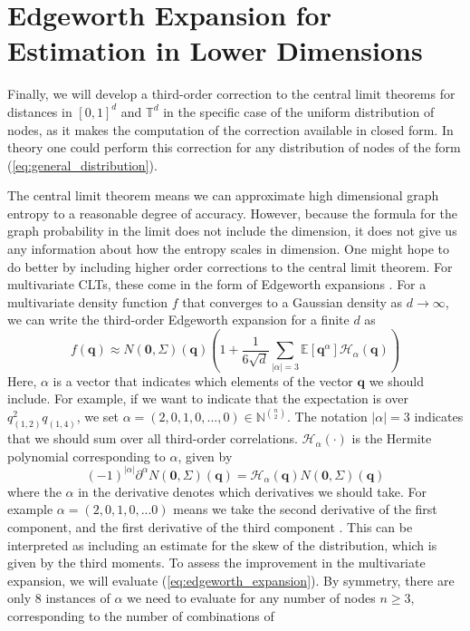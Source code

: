 \documentclass{article}
\newcommand{\tti}{\rightarrow\infty}
\begin{document}
\section{Edgeworth Expansion for Estimation in Lower Dimensions}
Finally, we will develop a third-order correction to the central limit theorems for distances in $[0,1]^d$ and $\mathbb{T}^d$ in the specific case of the uniform distribution of nodes, as it makes the computation of the correction available in closed form. In theory one could perform this correction for any distribution of nodes of the form (\ref{eq:general_distribution}). \newline

The central limit theorem means we can approximate high dimensional graph entropy to a reasonable degree of accuracy. However, because the formula for the graph probability in the limit does not include the dimension, it does not give us any information about how the entropy scales in dimension. One might hope to do better by including higher order corrections to the central limit theorem. For multivariate CLTs, these come in the form of Edgeworth expansions \cite{withers2000simple}. For a multivariate density function $f$ that converges to a Gaussian density as $d\tti$, we can write the third-order Edgeworth expansion for a finite $d$ as
\begin{equation}
    \label{eq:edgeworth_expansion}
    f(\boldsymbol{q}) \approx N(\boldsymbol{0}, \Sigma)(\boldsymbol{q})\left(1 + \frac{1}{6\sqrt{d}}\sum_{|\alpha| = 3} \mathbb{E}[\boldsymbol{q}^{\alpha}]\mathcal{H}_{\alpha}(\boldsymbol{q})\right)
\end{equation}
Here, $\alpha$ is a vector that indicates which elements of the vector $\boldsymbol{q}$ we should include. For example, if we want to indicate that the expectation is over $q_{(1,2)}^2q_{(1,4)}$, we set $\alpha = (2,0,1,0,...,0) \in \mathbb{N}^{\binom{n}{2}}$. The notation $|\alpha| = 3$ indicates that we should sum over all third-order correlations. $\mathcal{H}_{\alpha}(\cdot)$ is the Hermite polynomial corresponding to $\alpha$, given by
\begin{equation}
    (-1)^{|\alpha|} \partial^{\alpha} N(\boldsymbol{0}, \Sigma)(\boldsymbol{q}) = \mathcal{H}_{\alpha}(\boldsymbol{q})N(\boldsymbol{0}, \Sigma)(\boldsymbol{q})
\end{equation}
where the $\alpha$ in the derivative denotes which derivatives we should take. For example $\alpha = (2,0,1,0,...0)$ means we take the second derivative of the first component, and the first derivative of the third component \cite{skovgaard1986multivariate}. This can be interpreted as including an estimate for the skew of the distribution, which is given by the third moments. To assess the improvement in the multivariate expansion, we will evaluate (\ref{eq:edgeworth_expansion}). By symmetry, there are only 8 instances of $\alpha$ we need to evaluate for any number of nodes $n \geq 3$, corresponding to the number of combinations of 
\end{document}
